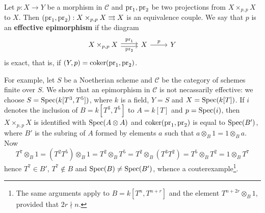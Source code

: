 \begin{example}
Let $p:X\to Y$ be a morphism in $\mathcal{C}$ and $\mathrm{pr}_1,\mathrm{pr}_2$ be two projections from $X\times_{p,p}X$ to $X$. Then $(\mathrm{pr}_1,\mathrm{pr}_2):X\times_{p,p}X\rightrightarrows X$ is an equivalence couple. We say that $p$ is an \textbf{effective epimorphism} if the diagram
\[\begin{tikzcd}
X\times_{p,p}X\ar[r,shift left=2pt,"\pr_1"]\ar[r,shift right=2pt,swap,"\pr_2"]&X\ar[r,"p"]&Y
\end{tikzcd}\]
is exact, that is, if $(Y,p)=\operatorname{coker}(\mathrm{pr}_1,\mathrm{pr}_2)$.\par
For example, let $S$ be a Noetherian scheme and $\mathcal{C}$ be the category of schemes finite over $S$. We show that an epimorphism in $\mathcal{C}$ is not necassarily effective: we choose $S=\mathrm{Spec}(k[T^3,T^5])$, where $k$ is a field, $Y=S$ and $X=\mathrm{Spec}(k[T])$. If $i$ denotes the inclusion of $B=k[T^3,T^5]$ to $A=k[T]$ and $p=\mathrm{Spec}(i)$, then $X\times_{p,p}X$ is identified with $\mathrm{Spec}(A\otimes A)$ and $\operatorname{coker}(\mathrm{pr}_1,\mathrm{pr}_2)$ is equal to $\mathrm{Spec}(B')$, where $B'$ is the subring of $A$ formed by elements $a$ such that $a\otimes_B1=1\otimes_Ba$. Now
\[T^7\otimes_B1=(T^2T^5)\otimes_B1=T^2\otimes_BT^5=T^2\otimes_B(T^3T^2)=T^5\otimes_BT^2=1\otimes_BT^7\]
hence $T^7\in B'$, $T^7\notin B$ and $\mathrm{Spec}(B)\neq\mathrm{Spec}(B')$, whence a couterexample\footnote{The same arguments apply to $B=k[T^n,T^{n+r}]$ and the element $T^{n+2r}\otimes_B1$, provided that $2r\nmid n$.}.
\end{example}

